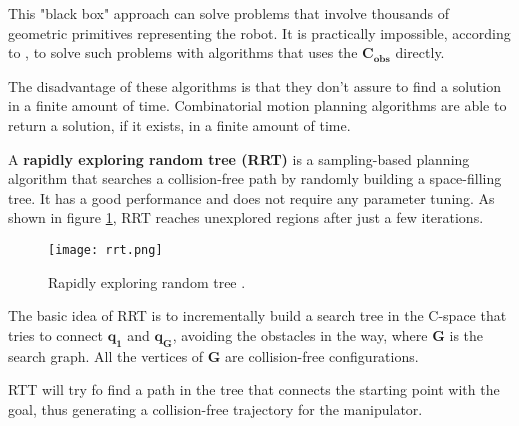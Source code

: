 This "black box" approach can solve problems that involve thousands of geometric primitives representing the robot. It is practically impossible, according to \citet{Handbook}, to solve such problems with algorithms that uses the $\bm{C_{obs}}$ directly.

The disadvantage of these algorithms is that they don't assure to find a solution in a finite amount of time. Combinatorial motion planning algorithms are able to return a solution, if it exists, in a finite amount of time.

A \textbf{rapidly exploring random tree (RRT)} is a sampling-based planning algorithm that searches a collision-free path by randomly building a space-filling tree. It has a good performance and does not require any parameter tuning. As shown in figure \ref{fig:rrt}, RRT reaches unexplored regions after just a few iterations. 
\begin{figure}[H]
	\centering
	\texttt{[image: rrt.png]}
	\vspace{-10pt}
	\caption[Rapidly exploring random tree]{Rapidly exploring random tree \citep[chap. 5, page 230]{planning}.}
	\vspace{-15pt}
	\label{fig:rrt}
\end{figure}
The basic idea of RRT is to incrementally build a search tree in the C-space that tries to connect $\bm{q_{1}}$ and $\bm{q_{G}}$, avoiding the obstacles in the way, where $\bm{G}$ is the search graph. All the vertices of $\bm{G}$ are collision-free configurations. 

RTT will try fo find a path in the tree that connects the starting point with the goal, thus generating a collision-free trajectory for the manipulator.


